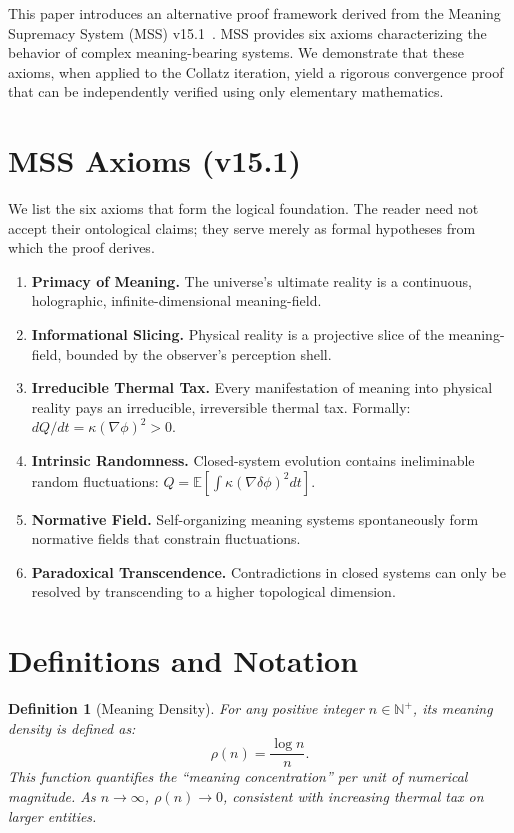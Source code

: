 \documentclass[11pt,a4paper]{article}
\newtheorem{definition}[theorem]{Definition}
\begin{document}
This paper introduces an alternative proof framework derived from the Meaning Supremacy System (MSS) v15.1~\cite{mss2026}. MSS provides six axioms characterizing the behavior of complex meaning-bearing systems. We demonstrate that these axioms, when applied to the Collatz iteration, yield a rigorous convergence proof that can be independently verified using only elementary mathematics.

\section{MSS Axioms (v15.1)}
\label{sec:axioms}

We list the six axioms that form the logical foundation. The reader need not accept their ontological claims; they serve merely as formal hypotheses from which the proof derives.

\begin{enumerate}[A1:]
\item \textbf{Primacy of Meaning.} The universe's ultimate reality is a continuous, holographic, infinite-dimensional meaning-field.
\item \textbf{Informational Slicing.} Physical reality is a projective slice of the meaning-field, bounded by the observer's perception shell.
\item \textbf{Irreducible Thermal Tax.} Every manifestation of meaning into physical reality pays an irreducible, irreversible thermal tax. Formally: $dQ/dt = \kappa(\nabla\phi)^2 > 0$.
\item \textbf{Intrinsic Randomness.} Closed-system evolution contains ineliminable random fluctuations: $Q = \mathbb{E}[\int\kappa(\nabla\delta\phi)^2 dt]$.
\item \textbf{Normative Field.} Self-organizing meaning systems spontaneously form normative fields that constrain fluctuations.
\item \textbf{Paradoxical Transcendence.} Contradictions in closed systems can only be resolved by transcending to a higher topological dimension.
\end{enumerate}

\section{Definitions and Notation}
\label{sec:defs}

\begin{definition}[Meaning Density]
For any positive integer $n\in\mathbb{N}^+$, its \emph{meaning density} is defined as:
\begin{equation}
\rho(n) = \frac{\log n}{n}.
\end{equation}
This function quantifies the ``meaning concentration'' per unit of numerical magnitude. As $n\to\infty$, $\rho(n)\to 0$, consistent with increasing thermal tax on larger entities.
\end{definition}
\end{document}
